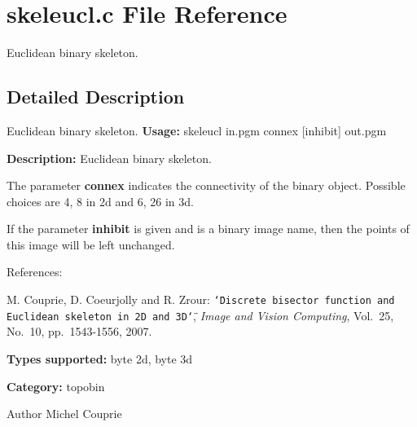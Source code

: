 \section{skeleucl.c File Reference}
\label{skeleucl_8c}


Euclidean binary skeleton.  




\subsection{Detailed Description}
Euclidean binary skeleton. {\bfseries Usage:} skeleucl in.pgm connex [inhibit] out.pgm

{\bfseries Description:} Euclidean binary skeleton.

The parameter {\bfseries connex} indicates the connectivity of the binary object. Possible choices are 4, 8 in 2d and 6, 26 in 3d.

If the parameter {\bfseries inhibit} is given and is a binary image name, then the points of this image will be left unchanged.

References:\par
 [CCZ07] M. Couprie, D. Coeurjolly and R. Zrour: {\tt \char`\"{}Discrete bisector function and Euclidean skeleton in 2D and 3D\char`\"{}}, {\itshape Image and Vision Computing\/}, Vol.~25, No.~10, pp.~1543-\/1556, 2007.\par


{\bfseries Types supported:} byte 2d, byte 3d

{\bfseries Category:} topobin

\begin{DoxyAuthor}{Author}
Michel Couprie 
\end{DoxyAuthor}
